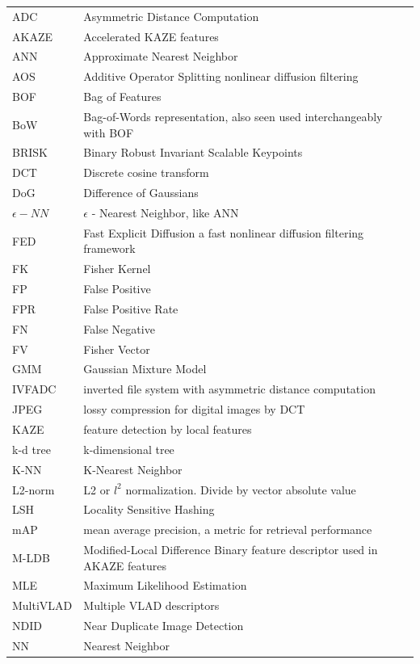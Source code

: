 \documentclass[english,12pt,a4paper,pdftex,elec,utf8]{aaltothesis}
\begin{document}
\begin{tabular}{ll}
  ADC & Asymmetric Distance Computation\\
  AKAZE & Accelerated KAZE features\\
  ANN & Approximate Nearest Neighbor\\
  AOS & Additive Operator Splitting nonlinear diffusion filtering\\
  BOF & Bag of Features\\
  BoW & Bag-of-Words representation, also seen used interchangeably with BOF\\
  BRISK & Binary Robust Invariant Scalable Keypoints\\
  DCT & Discrete cosine transform\\
  DoG & Difference of Gaussians\\
  $\epsilon -NN$ & $\epsilon$ - Nearest Neighbor, like ANN\\
  FED & Fast Explicit Diffusion a fast nonlinear diffusion filtering framework\\
  FK & Fisher Kernel\\
  FP & False Positive\\
  FPR & False Positive Rate\\
  FN & False Negative\\
  FV & Fisher Vector\\
  GMM & Gaussian Mixture Model\\
  IVFADC & inverted file system with asymmetric distance computation\\
  JPEG & lossy compression for digital images by DCT\\
  KAZE & feature detection by local features\\
  k-d tree & k-dimensional tree\\
  K-NN & K-Nearest Neighbor\\
  L2-norm & L2 or $l^2$ normalization. Divide by vector absolute value\\
  LSH & Locality Sensitive Hashing\\
  mAP & mean average precision, a metric for retrieval performance\\
  M-LDB & Modified-Local Difference Binary feature descriptor used in AKAZE features\\
  MLE & Maximum Likelihood Estimation\\
  MultiVLAD & Multiple VLAD descriptors\\
  NDID & Near Duplicate Image Detection\\
  NN & Nearest Neighbor\\

\end{tabular}
\end{document}
